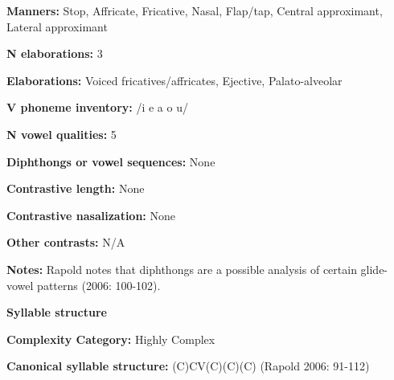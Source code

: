 \begin{styleBody}
\textbf{Manners:} Stop, Affricate, Fricative, Nasal, Flap/tap, Central approximant, Lateral approximant
\end{styleBody}

\begin{styleBody}
\textbf{N elaborations:} 3
\end{styleBody}

\begin{styleBody}
\textbf{Elaborations:} Voiced fricatives/affricates, Ejective, Palato-alveolar
\end{styleBody}

\begin{styleBody}
\textbf{V phoneme inventory:} /i e a o u/
\end{styleBody}

\begin{styleBody}
\textbf{N vowel qualities:} 5
\end{styleBody}

\begin{styleBody}
\textbf{Diphthongs or vowel sequences:} None
\end{styleBody}

\begin{styleBody}
\textbf{Contrastive length:} None
\end{styleBody}

\begin{styleBody}
\textbf{Contrastive nasalization:} None
\end{styleBody}

\begin{styleBody}
\textbf{Other contrasts:} N/A
\end{styleBody}

\begin{styleBody}
\textbf{Notes:} Rapold notes that diphthongs are a possible analysis of certain glide-vowel patterns (2006: 100-102).
\end{styleBody}

\begin{styleBody}
\textbf{Syllable structure}
\end{styleBody}

\begin{styleBody}
\textbf{Complexity Category:} Highly Complex
\end{styleBody}

\begin{styleBody}
\textbf{Canonical syllable structure:} (C)CV(C)(C)(C)\textbf{ }(Rapold 2006: 91-112)
\end{styleBody}

